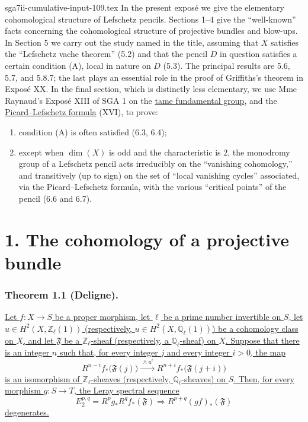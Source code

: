 \begin{filecontents*}{sga7ii-cumulative-input-109.tex}
In the present expos\'e we give the elementary cohomological structure of
Lefschetz pencils. Sections 1--4 give the ``well-known'' facts concerning the
cohomological structure of projective bundles and blow-ups. In Section 5 we
carry out the study named in the title, assuming that $X$ satisfies the
``Lefschetz vache theorem'' (5.2) and that the pencil $D$ in question satisfies
a certain condition (A), local in nature on $D$ (5.3). The principal results
are 5.6, 5.7, and 5.8.7; the last plays an essential role in the proof of
Griffiths's theorem in Expos\'e XX. In the final section, which is distinctly
less elementary, we use Mme Raynaud's Expos\'e XIII of SGA 1 on the
\underline{tame fundamental group}, and the \underline{Picard--Lefschetz
formula} (XVI), to prove:
\begin{enumerate}[label=(\arabic*)]
\item condition (A) is often satisfied (6.3, 6.4);
\item except when $\dim(X)$ is odd and the characteristic is $2$, the
monodromy group of a Lefschetz pencil acts irreducibly on the ``vanishing
cohomology,'' and transitively (up to sign) on the set of ``local vanishing
cycles'' associated, via the Picard--Lefschetz formula, with the various
``critical points'' of the pencil (6.6 and 6.7).
\end{enumerate}

\section*{1. The cohomology of a projective bundle}

\subsubsection*{Theorem 1.1 (Deligne).}
\underline{Let $f:X\longrightarrow S$ be a proper morphism, let $\ell$ be a
prime number invertible on $S$, let
$u\in H^2(X,\mathbb Z_\ell(1))$ (respectively,
$u\in H^2(X,\mathbb Q_\ell(1))$) be a cohomology class on $X$, and let
$\mathfrak F$ be a $\mathbb Z_\ell$-sheaf (respectively, a
$\mathbb Q_\ell$-sheaf) on $X$. Suppose that there is an integer $n$ such
that, for every integer $j$ and every integer $i>0$, the map}
\begin{equation}\tag{1.1.1}
R^{n-i}f_*\bigl(\mathfrak F(j)\bigr)
\xrightarrow{\ \wedge u^i\ }
R^{n+i}f_*\bigl(\mathfrak F(j+i)\bigr)
\end{equation}
\underline{is an isomorphism of $\mathbb Z_\ell$-sheaves (respectively,
$\mathbb Q_\ell$-sheaves) on $S$. Then, for every morphism
$g:S\longrightarrow T$, the Leray spectral sequence}
\[
E_2^{p,q}=R^pg_*R^qf_*(\mathfrak F)
\Longrightarrow R^{p+q}(gf)_*(\mathfrak F)
\]
\underline{degenerates.}


\end{filecontents*}
